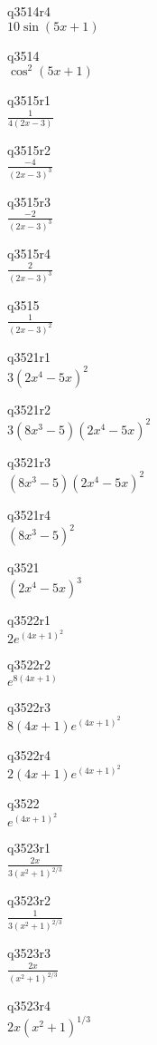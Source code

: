 q3514r4\\
\(\displaystyle 10\sin(5x + 1) \)

q3514\\
\(\displaystyle \cos^2 (5x + 1) \)

q3515r1\\
\(\displaystyle \frac{1}{4(2x - 3)} \)

q3515r2\\
\(\displaystyle \frac{-4}{(2x - 3)^3} \)

q3515r3\\
\(\displaystyle \frac{-2}{(2x - 3)^3} \)

q3515r4\\
\(\displaystyle \frac{2}{(2x -3)^3} \)

q3515\\
\(\displaystyle \frac{1}{(2x - 3)^2} \)

q3521r1\\
\(\displaystyle 3(2x^4 - 5x)^2 \)

q3521r2\\
\(\displaystyle 3(8x^3 - 5)(2x^4 - 5x)^2 \)

q3521r3\\
\(\displaystyle (8x^3 - 5)(2x^4 - 5x)^2 \)

q3521r4\\
\(\displaystyle (8x^3 - 5)^2 \)

q3521\\
\(\displaystyle (2x^4 - 5x)^3 \)

q3522r1\\
\(\displaystyle 2e^{(4x + 1)^2} \)

q3522r2\\
\(\displaystyle e^{8(4x + 1)} \)

q3522r3\\
\(\displaystyle 8(4x + 1)e^{(4x + 1)^2} \)

q3522r4\\
\(\displaystyle 2(4x + 1)e^{(4x + 1)^2} \)

q3522\\
\(\displaystyle e^{(4x + 1)^2} \)

q3523r1\\
\(\displaystyle \frac{2x}{3(x^2 + 1)^{2/3}} \)

q3523r2\\
\(\displaystyle \frac{1}{3(x^2 + 1)^{2/3}} \)

q3523r3\\
\(\displaystyle \frac{2x}{(x^2 + 1)^{2/3}} \)

q3523r4\\
\(\displaystyle 2x(x^2 + 1)^{1/3} \)

